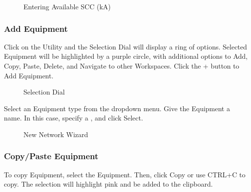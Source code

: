 \documentclass[letterpaper,10pt,english]{sphinxmanual}
\begin{document}
\begin{figure}[H]
\centering
\capstart

\noindent{}
\caption{Entering Available SCC (kA)}\label{\detokenize{docs/userguide/buildingelectricalmodel/one-line/index-one-line:id3}}\end{figure}


\subsubsection{Add Equipment}
\label{\detokenize{docs/userguide/buildingelectricalmodel/one-line/index-one-line:add-equipment}}\label{\detokenize{docs/userguide/buildingelectricalmodel/one-line/index-one-line:one-line-adding-equipment}}
Click on the Utility and the Selection Dial will display a ring of options.  Selected Equipment will be highlighted by a purple circle, with additional options to Add, Copy, Paste, Delete, and Navigate to other Workspaces.  Click the + button to Add Equipment.

\begin{figure}[H]
\centering
\capstart

\noindent{}
\caption{Selection Dial}\label{\detokenize{docs/userguide/buildingelectricalmodel/one-line/index-one-line:id4}}\end{figure}

Select an Equipment type from the dropdown menu.  Give the Equipment a name.  In this case, specify a {\hyperref[\detokenize{docs/faq:load-capacity}]{}}, and click Select.

\begin{figure}[H]
\centering
\capstart

\noindent{}
\caption{New Network Wizard}\label{\detokenize{docs/userguide/buildingelectricalmodel/one-line/index-one-line:id5}}\end{figure}

\ignorespaces 

\subsubsection{Copy/Paste Equipment}
\label{\detokenize{docs/userguide/buildingelectricalmodel/one-line/index-one-line:copy-paste-equipment}}\label{\detokenize{docs/userguide/buildingelectricalmodel/one-line/index-one-line:one-line-copying-equipment}}\label{\detokenize{docs/userguide/buildingelectricalmodel/one-line/index-one-line:index-1}}
To copy Equipment, select the Equipment.  Then, click Copy or use CTRL+C to copy.  The selection will highlight pink and be added to the clipboard.
\end{document}
